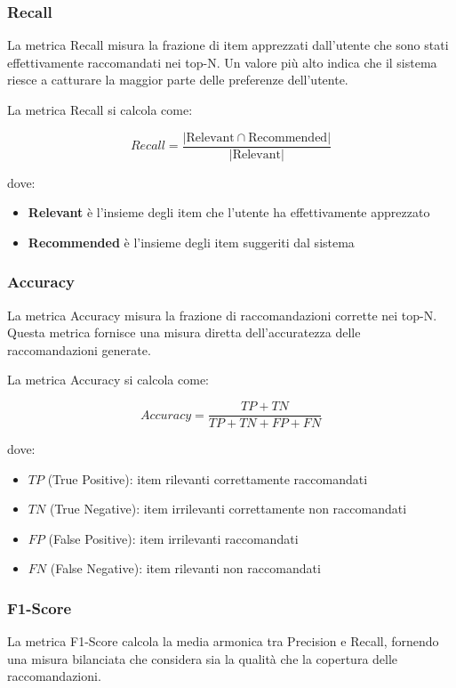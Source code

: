 \subsubsection{Recall}
La metrica Recall misura la frazione di item apprezzati dall'utente che sono stati effettivamente raccomandati nei top-N. Un valore più alto indica che il sistema riesce a catturare la maggior parte delle preferenze dell'utente.

La metrica Recall si calcola come:

\[
Recall = \frac{|\text{Relevant} \cap \text{Recommended}|}{|\text{Relevant}|}
\]

dove:
\begin{itemize}
    \item \textbf{Relevant} è l’insieme degli item che l’utente ha effettivamente apprezzato
    \item \textbf{Recommended} è l’insieme degli item suggeriti dal sistema
\end{itemize}


\subsubsection{Accuracy}
La metrica Accuracy misura la frazione di raccomandazioni corrette nei top-N. Questa metrica fornisce una misura diretta dell'accuratezza delle raccomandazioni generate.

La metrica Accuracy si calcola come:

\[
Accuracy = \frac{TP + TN}{TP + TN + FP + FN}
\]

dove:
\begin{itemize}
    \item $TP$ (True Positive): item rilevanti correttamente raccomandati
    \item $TN$ (True Negative): item irrilevanti correttamente non raccomandati
    \item $FP$ (False Positive): item irrilevanti raccomandati
    \item $FN$ (False Negative): item rilevanti non raccomandati
\end{itemize}


\subsubsection{F1-Score}
La metrica F1-Score calcola la media armonica tra Precision e Recall, fornendo una misura bilanciata che considera sia la qualità che la copertura delle raccomandazioni.


